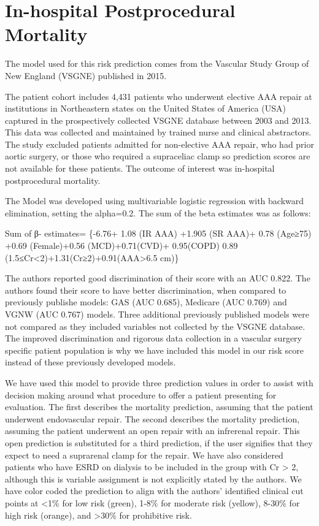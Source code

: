 \documentclass[
]{book}
\begin{document}
\hypertarget{in-hospital-postprocedural-mortality}{%
\section{In-hospital Postprocedural Mortality}\label{in-hospital-postprocedural-mortality}}

The model used for this risk prediction comes from the Vascular Study Group of New England (VSGNE) published in 2015. \citet{eslami2015}

The patient cohort includes 4,431 patients who underwent elective AAA repair at institutions in Northeastern states on the United States of America (USA) captured in the prospectively collected VSGNE database between 2003 and 2013. This data was collected and maintained by trained nurse and clinical abstractors. The study excluded patients admitted for non-elective AAA repair, who had prior aortic surgery, or those who required a supraceliac clamp so prediction scores are not available for these patients. The outcome of interest was in-hospital postprocedural mortality.

The Model was developed using multivariable logistic regression with backward elimination, setting the alpha=0.2. The sum of the beta estimates was as follows:

Sum of β- estimates= \{-6.76+ 1.08 (IR AAA) +1.905 (SR AAA)+ 0.78 (Age≥75) +0.69 (Female)+0.56 (MCD)+0.71(CVD)+ 0.95(COPD) 0.89 (1.5≤Cr\textless2)+1.31(Cr≥2)+0.91(AAA\textgreater6.5 cm)\}

The authors reported good discrimination of their score with an AUC 0.822. The authors found their score to have better discrimination, when compared to previously publishe models: GAS (AUC 0.685), Medicare (AUC 0.769) and VGNW (AUC 0.767) models. Three additional previously published models were not compared as they included variables not collected by the VSGNE database. The improved discrimination and rigorous data collection in a vascular surgery specific patient population is why we have included this model in our risk score instead of these previously developed models.

We have used this model to provide three prediction values in order to assist with decision making around what procedure to offer a patient presenting for evaluation. The first describes the mortality prediction, assuming that the patient underwent endovascular repair. The second describes the mortality prediction, assuming the patient underwent an open repair with an infrerenal repair. This open prediction is substituted for a third prediction, if the user signifies that they expect to need a suprarenal clamp for the repair. We have also considered patients who have ESRD on dialysis to be included in the group with Cr \textgreater{} 2, although this is variable assignment is not explicitly stated by the authors. We have color coded the prediction to align with the authors' identified clinical cut points at \textless1\% for low risk (green), 1-8\% for moderate risk (yellow), 8-30\% for high risk (orange), and \textgreater30\% for prohibitive risk.
\end{document}
